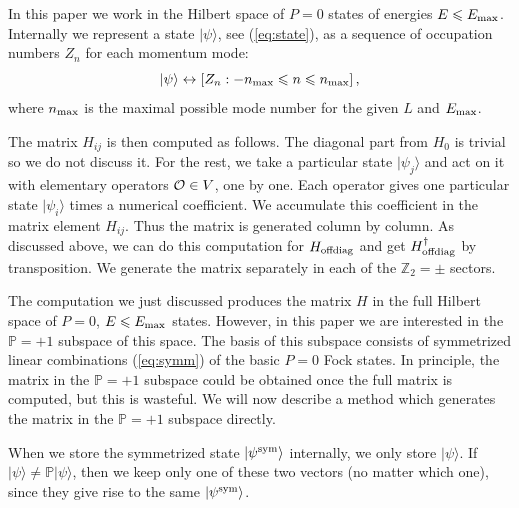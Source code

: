 \documentclass[11pt]{article}
\newcommand{\reef}[1]{(\ref{#1})}
\newcommand{\beq}{\begin{equation}}
\newcommand{\eeq}{\end{equation}}
\def\bZ {\mathbb{Z}}
\def\calO {{\cal O}}
\def\bZ {\mathbb{Z}}
\def\bP {\mathbb{P}}
\def\le{\leqslant}
\newcommand{\ket}[1]{|#1\rangle}
\def \nmax{n_{\rm max}}
\def \Emax{E_{\rm max}}
\numberwithin{equation}{section}
\begin{document}
\noindent{\bf $\bP$-conservation}
\nopagebreak

\noindent In this paper we work in the Hilbert space of $P=0$ states of energies $E\le \Emax$.
Internally we represent a state $\ket{\psi}$, see \reef{eq:state}, as a sequence of occupation numbers $Z_n$ for each momentum mode:
\beq
\label{eq:intern}
\ket{\psi} \leftrightarrow [Z_n:-\nmax\le n\le \nmax]\,,
\eeq
where $\nmax$ is the maximal possible mode number for the given $L$ and $\Emax$.

The matrix $H_{ij}$ is then computed as follows. The diagonal part from $H_0$ is trivial so we do not discuss it. For the rest, we take a particular state $\ket{\psi_j}$ and act on it with elementary operators $\calO\in V$, one by one. Each operator gives one particular state $\ket{\psi_i}$ times a numerical coefficient. We accumulate this coefficient in the matrix element $H_{ij}$. Thus the matrix is generated column by column. As discussed above, we can do this computation for $H_{\rm offdiag}$ and get $H^\dagger_{\rm offdiag}$ by transposition. We generate the matrix separately in each of the $\bZ_2=\pm$ sectors.

The computation we just discussed produces the matrix $H$ in the full Hilbert space of $P=0$, $E\le \Emax$ states. However, in this paper we are interested in the $\bP=+1$ subspace of this space. The basis of this subspace consists of symmetrized linear combinations \reef{eq:symm} of the basic $P=0$ Fock states. In principle, the matrix in the $\bP=+1$ subspace could be obtained once the full matrix is computed, but this is wasteful. We will now describe a method which generates the matrix in the $\bP=+1$ subspace directly.

\def\sym{{\rm sym}}
When we store the symmetrized state $\ket{\psi^{\rm sym}}$ internally, we only store $\ket{\psi}$. If $\ket{\psi}\ne \bP\ket{\psi}$, then we keep only one of these two vectors (no matter which one), since they give rise to the same $\ket{\psi^{\rm sym}}$. 
\end{document}
